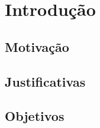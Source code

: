 \chapter{Introdução}\label{ch:introducao}

\section{Motivação}\label{sec:Motivacao}


\section{Justificativas}\label{sec:Justificativas}


\section{Objetivos}\label{sec:Objetivos}

